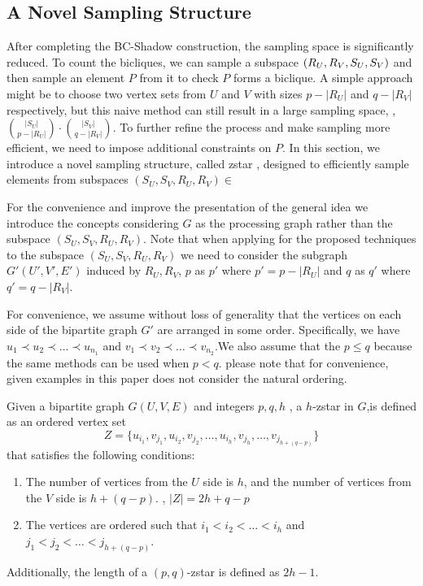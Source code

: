 
\subsection{A Novel Sampling Structure}
After completing the BC-Shadow construction, the sampling space is significantly reduced. To count the bicliques, we can sample a subspace $(R_U, R_V, S_U, S_V)$ and then sample an element $P$ from it to check $P$ forms a biclique. A simple approach might be to choose two vertex sets from $U$ and $V$ with sizes $p-|R_U|$ and $q-|R_V|$ respectively, but this naive method can still result in a large sampling space, \ie,$\binom{|S_U|}{p-|R_U|} \cdot \binom{|S_V|}{q-|R_V|}$. To further refine the process and make sampling more efficient, we need to impose additional constraints on $P$. In this section, we introduce a novel sampling structure, called zstar \cite{zigzag}, designed to efficiently sample elements from subspaces $(S_U,S_V,R_U,R_V) \in$ \shadow

For the convenience and improve the presentation of the general idea we introduce the concepts considering $G$ as the processing graph rather than the subspace $(S_U,S_V,R_U,R_V)$. Note that when applying for the proposed techniques to the subspace $(S_U,S_V,R_U,R_V)$ we need to consider the subgraph $G'(U',V',E')$ induced by $R_U,R_V$, $p$ as $p'$ where $p' = p-|R_U|$ and $q$ as $q'$ where $q' = q-|R_V|$.

For convenience, we assume without loss of generality that the vertices on each side of the bipartite graph $G'$ are arranged in some order.  Specifically, we have $u_1 \prec u_2 \prec \dots \prec u_{n_1}$ and $v_1 \prec v_2 \prec \dots \prec v_{n_2}$.We also assume that the $p \leq q$ because the same methods can be used when $p < q$. please note that for convenience, given examples in this paper does not consider the natural  ordering.

\begin{definition}
	\label{def:zstar}
	Given a bipartite graph $G(U, V, E)$ and integers $p,q,h$ , a $h$-zstar in $G$,is defined as an ordered vertex set
	\[
	Z = \{ u_{i_1}, v_{j_1}, u_{i_2}, v_{j_2}, \dots, u_{i_{h}}, v_{j_{h}}, \dots, v_{j_{h + (q - p)}} \}
	\]
	that satisfies the following conditions:
	\begin{enumerate}
		\item The number of vertices from the $U$ side is $h$, and the number of vertices from the $V$ side is $h + (q - p)$. \ie, $|Z|=2h+q-p$
		\item The vertices are ordered such that $i_1 < i_2 < \dots < i_{h}$ and $j_1 < j_2 < \dots < j_{h + (q - p)}$.
	\end{enumerate}
	Additionally, the length of a $(p, q)$-zstar is defined as $2h - 1$.
\end{definition}

